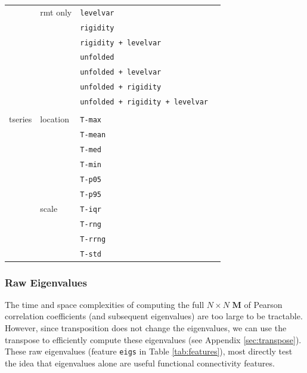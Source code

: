 \documentclass[12pt]{spieman}  %
\newcommand{\code}[1]{\small\texttt{#1}\normalsize}
\newcommand{\tcode}[1]{\footnotesize\texttt{#1}\normalsize}
\begin{document}
\begin{spacing}{2}
\begin{table}[h!]
\begin{tabular}{lllr}
               & rmt only      & \tcode{levelvar}                       \\
               &               & \tcode{rigidity}                       \\
               &               & \tcode{rigidity + levelvar}            \\
               &               & \tcode{unfolded}                       \\
               &               & \tcode{unfolded + levelvar}            \\
               &               & \tcode{unfolded + rigidity}            \\
               &               & \tcode{unfolded + rigidity + levelvar} \\
               &               &                                        \\
tseries        & location      & \tcode{T-max}                          \\
               &               & \tcode{T-mean}                         \\
               &               & \tcode{T-med}                          \\
               &               & \tcode{T-min}                          \\
               &               & \tcode{T-p05}                          \\
               &               & \tcode{T-p95}                          \\
               & scale         & \tcode{T-iqr}                          \\
               &               & \tcode{T-rng}                          \\
               &               & \tcode{T-rrng}                         \\
               &               & \tcode{T-std}                          \\
\hline
\end{tabular}
\end{table}

\subsubsection{Raw Eigenvalues}
\label{sec:raw-eigs}

The time and space complexities of computing the full \(N \times N\)
\(\mathbf{M}\) of Pearson correlation coefficients (and subsequent eigenvalues) are too
large to be tractable. However, since transposition does not change the
eigenvalues, we can use the transpose to efficiently compute these eigenvalues
(see Appendix \ref{sec:transpose}). These raw eigenvalues (feature \code{eigs}
in Table \ref{tab:features}), most directly test the idea that eigenvalues
alone are useful functional connectivity features.


\end{spacing}
\end{document}
